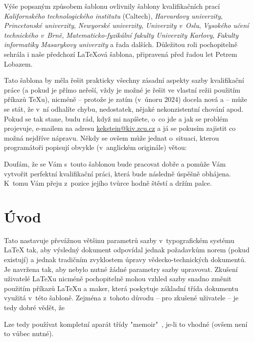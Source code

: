 \documentclass[czech, ma, kiv, he, iso690alph, pdf, viewonly]{fasthesis}
\begin{document}
Výše popsaným způsobem šablonu ovlivnily šablony kvalifikačních prací \emph{Kalifornského technologického institutu} (Caltech), \emph{Harvardovy univerzity}, \emph{Princetonské univerzity}, \emph{Newyorské univerzity}, \emph{Univerzity v~Oslu}, \emph{Vysokého učení technického v~Brně}, \emph{Matematicko-fyzikální fakulty Univerzity Karlovy}, \emph{Fakulty informatiky Masarykovy univerzity} a řada dalších. Důležitou roli pochopitelně sehrála i naše předchozí \LaTeX{}\-ová šablona, připravená před řadou let Petrem Lobazem.

Tato šablona by měla řešit prakticky všechny zásadní aspekty sazby kvalifikační práce (a pokud je přímo neřeší, vždy je možné je řešit ve vlastní režii použitím příkazů \TeX{}u), nicméně -- protože je zatím (v~únoru 2024) docela nová a  -- může se stát, že v~ní odhalíte chybu, nedostatek, nějaké nekonzistentní chování apod. Pokud se tak stane, budu rád, když mi napíšete, o~co jde a jak se problém projevuje, e-mailem na adresu \url{kekstein@kiv.zcu.cz} a já se pokusím zajistit co možná nejdříve nápravu. Někdy se ovšem může jednat o~situaci, kterou programátoři popisují obvykle (v~anglickém originále) větou: 

Doufám, že se Vám s~touto šablonou bude pracovat dobře a pomůže Vám vytvořit perfektní kvalifikační práci, která bude následně úspěšně obhájena. K~tomu Vám přeju z~pozice jejího tvůrce hodně štěstí a držím palce.
%
%
%
%
\chapter{Úvod}
Tato  nastavuje převážnou většinu parametrů sazby v~typografickém systému \LaTeX{} tak, aby výsledný dokument odpovídal jednak požadavkům norem (pokud existují) a jednak tradičním zvyklostem úpravy vědecko-technických dokumentů. Je navržena tak, aby nebylo nutné žádné parametry sazby  upravovat. Zkušení uživatelé \LaTeX{}u nicméně pochopitelně mohou vzhled sazby snadno změnit použitím příkazů \LaTeX{}u a maker, která poskytuje základní třída dokumentu využitá v~této šabloně. Zejména z~tohoto důvodu -- pro zkušené uživatele -- je tedy dobré vědět, že
\begin{center}
\end{center}
Lze tedy používat kompletní aparát třídy \filename"memoir"~\cite{memoir}, je-li to vhodné (ovšem není to vůbec nutné).
\end{document}
